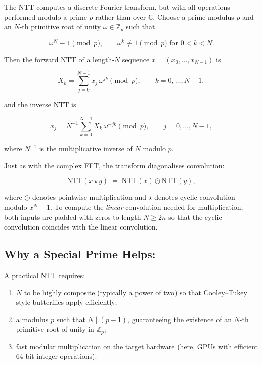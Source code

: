The NTT computes a discrete Fourier transform, but with all operations performed
modulo a prime $p$ rather than over $\mathbb{C}$. Choose a prime modulus $p$ and
an $N$-th primitive root of unity $\omega \in \mathbb{Z}_p$ such that

\[
\omega^N \equiv 1 \pmod p,\qquad
\omega^k \not\equiv 1 \pmod p \text{ for } 0<k<N.
\]

Then the forward NTT of a length-$N$ sequence $x = (x_0,\dots,x_{N-1})$ is

\[
X_k = \sum_{j=0}^{N-1} x_j \,\omega^{jk} \pmod p,\qquad k=0,\dots,N-1,
\]

and the inverse NTT is

\[
x_j = N^{-1} \sum_{k=0}^{N-1} X_k \,\omega^{-jk} \pmod p,\qquad j=0,\dots,N-1,
\]

where $N^{-1}$ is the multiplicative inverse of $N$ modulo $p$.

Just as with the complex FFT, the transform diagonalises convolution:

\[
\mathrm{NTT}(x \star y) \;=\; \mathrm{NTT}(x)\odot \mathrm{NTT}(y),
\]

where $\odot$ denotes pointwise multiplication and $\star$ denotes cyclic
convolution modulo $x^N-1$. To compute the \emph{linear} convolution needed for
multiplication, both inputs are padded with zeros to length $N \ge 2n$ so that the
cyclic convolution coincides with the linear convolution.

\subsection{Why a Special Prime Helps: }

A practical NTT requires:

\begin{enumerate}

\item $N$ to be highly composite (typically a power of two) so that
Cooley--Tukey style butterflies apply efficiently;

\item a modulus $p$ such that $N \mid (p-1)$, guaranteeing the existence of an
$N$-th primitive root of unity in $\mathbb{Z}_p$;

\item fast modular multiplication on the target hardware (here, GPUs with
efficient 64-bit integer operations).

\end{enumerate}

